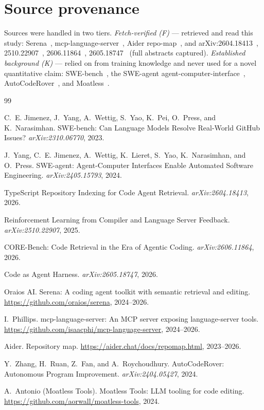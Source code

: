 \documentclass[11pt]{article}
\begin{document}
\appendix
\section{Source provenance}
Sources were handled in two tiers. \emph{Fetch-verified (F)} --- retrieved and read this study:
Serena~\cite{serena}, mcp-language-server~\cite{mcpls}, Aider repo-map~\cite{aidermap}, and
arXiv:2604.18413~\cite{tsindex}, 2510.22907~\cite{rlcsf}, 2606.11864~\cite{corebench},
2605.18747~\cite{codeharness} (full abstracts captured). \emph{Established background (K)} --- relied on
from training knowledge and never used for a novel quantitative claim: SWE-bench~\cite{swebench},
the SWE-agent agent-computer-interface~\cite{sweagent}, AutoCodeRover~\cite{autocoderover}, and
Moatless~\cite{moatless}.

\begin{thebibliography}{99}

 C.~E. Jimenez, J.~Yang, A.~Wettig, S.~Yao, K.~Pei, O.~Press, and K.~Narasimhan.
\newblock SWE-bench: Can Language Models Resolve Real-World GitHub Issues?
\newblock \emph{arXiv:2310.06770}, 2023.

 J.~Yang, C.~E. Jimenez, A.~Wettig, K.~Lieret, S.~Yao, K.~Narasimhan, and O.~Press.
\newblock SWE-agent: Agent-Computer Interfaces Enable Automated Software Engineering.
\newblock \emph{arXiv:2405.15793}, 2024.

 TypeScript Repository Indexing for Code Agent Retrieval.
\newblock \emph{arXiv:2604.18413}, 2026.

 Reinforcement Learning from Compiler and Language Server Feedback.
\newblock \emph{arXiv:2510.22907}, 2025.

 CORE-Bench: Code Retrieval in the Era of Agentic Coding.
\newblock \emph{arXiv:2606.11864}, 2026.

 Code as Agent Harness.
\newblock \emph{arXiv:2605.18747}, 2026.

 Oraios AI. Serena: A coding agent toolkit with semantic retrieval and editing.
\newblock \url{https://github.com/oraios/serena}, 2024--2026.

 I.~Phillips. mcp-language-server: An MCP server exposing language-server tools.
\newblock \url{https://github.com/isaacphi/mcp-language-server}, 2024--2026.

 Aider. Repository map.
\newblock \url{https://aider.chat/docs/repomap.html}, 2023--2026.

 Y.~Zhang, H.~Ruan, Z.~Fan, and A.~Roychoudhury.
\newblock AutoCodeRover: Autonomous Program Improvement.
\newblock \emph{arXiv:2404.05427}, 2024.

 A.~Antonio (Moatless Tools).
\newblock Moatless Tools: LLM tooling for code editing.
\newblock \url{https://github.com/aorwall/moatless-tools}, 2024.

\end{thebibliography}
\end{document}
